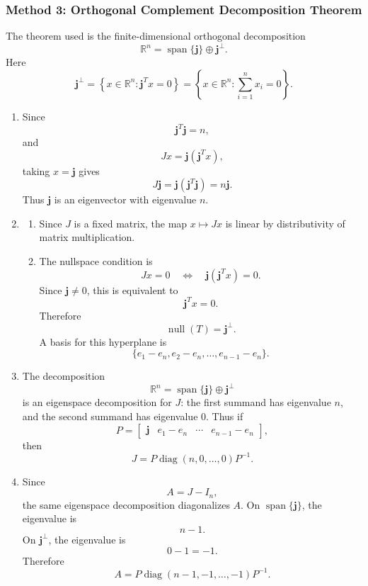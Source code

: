 \documentclass[12pt]{article}
\newcommand{\R}{\mathbb{R}}
\newcommand{\Null}{\operatorname{null}}
\newcommand{\Span}{\operatorname{span}}
\newcommand{\diag}{\operatorname{diag}}
\begin{document}
\newpage
\subsubsection{Method 3: Orthogonal Complement Decomposition Theorem}
The theorem used is the finite-dimensional orthogonal decomposition
\[
\R^n=\Span\{\mathbf j\}\oplus \mathbf j^\perp.
\]
Here
\[
\mathbf j^\perp=\left\{x\in\R^n:\mathbf j^Tx=0\right\}=\left\{x\in\R^n:\sum_{i=1}^{n}x_i=0\right\}.
\]

\begin{enumerate}[label=(\alph*)]
  \item Since
  \[
  \mathbf j^T\mathbf j=n,
  \]
  and
  \[
  Jx=\mathbf j(\mathbf j^Tx),
  \]
  taking $x=\mathbf j$ gives
  \[
  J\mathbf j=\mathbf j(\mathbf j^T\mathbf j)=n\mathbf j.
  \]
  Thus $\mathbf j$ is an eigenvector with eigenvalue $n$.

  \item
  \begin{enumerate}[label=(\roman*)]
    \item Since $J$ is a fixed matrix, the map $x\mapsto Jx$ is linear by distributivity of matrix multiplication.

    \item The nullspace condition is
    \[
    Jx=0
    \quad\Longleftrightarrow\quad
    \mathbf j(\mathbf j^Tx)=0.
    \]
    Since $\mathbf j\ne0$, this is equivalent to
    \[
    \mathbf j^Tx=0.
    \]
    Therefore
    \[
    \Null(T)=\mathbf j^\perp.
    \]
    A basis for this hyperplane is
    \[
    \boxed{\{e_1-e_n,e_2-e_n,\ldots,e_{n-1}-e_n\}.}
    \]
  \end{enumerate}

  \item The decomposition
  \[
  \R^n=\Span\{\mathbf j\}\oplus \mathbf j^\perp
  \]
  is an eigenspace decomposition for $J$: the first summand has eigenvalue $n$, and the second summand has eigenvalue $0$. Thus if
  \[
  P=\begin{bmatrix}\mathbf j& e_1-e_n&\cdots&e_{n-1}-e_n\end{bmatrix},
  \]
  then
  \[
  \boxed{J=P\diag(n,0,\ldots,0)P^{-1}.}
  \]

  \item Since
  \[
  A=J-I_n,
  \]
  the same eigenspace decomposition diagonalizes $A$. On $\Span\{\mathbf j\}$, the eigenvalue is
  \[
  n-1.
  \]
  On $\mathbf j^\perp$, the eigenvalue is
  \[
  0-1=-1.
  \]
  Therefore
  \[
  \boxed{A=P\diag(n-1,-1,\ldots,-1)P^{-1}.}
  \]
\end{enumerate}
\end{document}
